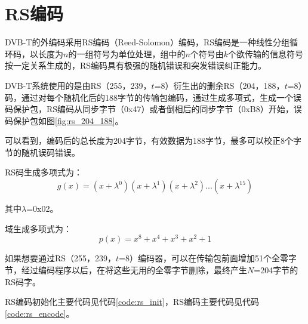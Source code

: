 	\section{RS编码}
		\par DVB-T的外编码采用RS编码（Reed-Solomon）编码，RS编码是一种线性分组循环码，以长度为$n$的一组符号为单位处理，组中的$n$个符号由$k$个欲传输的信息符号按一定关系生成的，RS编码具有极强的随机错误和突发错误纠正能力。
		\par DVB-T系统使用的是由RS（255，239，$t$=8）衍生出的删余RS（204，188，$t$=8）码，通过对每个随机化后的188字节的传输包编码，通过生成多项式，生成一个误码保护包，RS编码从同步字节（0x47）或者倒相后的同步字节（0xB8）开始，误码保护包如图\ref{fig:rs_204_188}。\cite{RS编码器的设计与实现_游余新}
		
		\par 可以看到，编码后的总长度为204字节，有效数据为188字节，最多可以校正8个字节的随机误码错误。
		\par RS码生成多项式为：
		\begin{equation}
			g(x)=(x+\lambda ^0)(x+\lambda ^1)(x+\lambda ^2)...(x+\lambda ^{15})
		\end{equation}
		\par 其中$\lambda$=0x02。
		\par 域生成多项式为：
		\begin{equation}
			p(x)=x^8+x^4+x^3+x^2+1
		\end{equation}
		\par 如果想要通过RS（255，239，$t$=8）编码器，可以在传输包前面增加51个全零字节，经过编码程序以后，在将这些无用的全零字节删除，最终产生$N$=204字节的RS码字。
		\par RS编码初始化主要代码见代码\ref{code:rs_init}，RS编码主要代码见代码\ref{code:rs_encode}。

